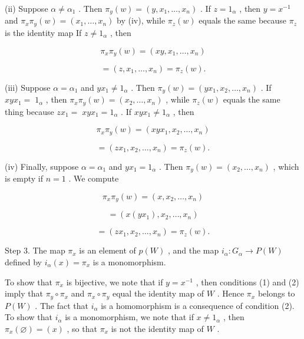 \documentclass[10pt]{article}
\begin{document}
(ii) Suppose \(\alpha  \neq  {\alpha }_{1}\) . Then \({\pi }_{y}\left( w\right)  = \left( {y,{x}_{1},\ldots ,{x}_{n}}\right)\) . If \(z = {1}_{\alpha }\) , then \(y = {x}^{-1}\) and \({\pi }_{x}{\pi }_{y}\left( w\right)  = \left( {{x}_{1},\ldots ,{x}_{n}}\right)\) by (iv), while \({\pi }_{z}\left( w\right)\) equals the same because \({\pi }_{z}\) is the identity map If \(z \neq  {1}_{\alpha }\) , then

\[
{\pi }_{x}{\pi }_{y}\left( w\right)  = \left( {{xy},{x}_{1},\ldots ,{x}_{n}}\right)
\]

\[
= \left( {z,{x}_{1},\ldots ,{x}_{n}}\right)  = {\pi }_{z}\left( w\right) .
\]

(iii) Suppose \(\alpha  = {\alpha }_{1}\) and \(y{x}_{1} \neq  {1}_{\alpha }\) . Then \({\pi }_{y}\left( w\right)  = \left( {y{x}_{1},{x}_{2},\ldots ,{x}_{n}}\right)\) . If \({xy}{x}_{1} = \; {1}_{\alpha }\) , then \({\pi }_{x}{\pi }_{y}\left( w\right)  = \left( {{x}_{2},\ldots ,{x}_{n}}\right)\) , while \({\pi }_{z}\left( w\right)\) equals the same thing because \(z{x}_{1} = \; {xy}{x}_{1} = {1}_{\alpha }\) . If \({xy}{x}_{1} \neq  {1}_{\alpha }\) , then

\[
{\pi }_{x}{\pi }_{y}\left( w\right)  = \left( {{xy}{x}_{1},{x}_{2},\ldots ,{x}_{n}}\right)
\]

\[
= \left( {z{x}_{1},{x}_{2},\ldots ,{x}_{n}}\right)  = {\pi }_{z}\left( w\right) .
\]

(iv) Finally, suppose \(\alpha  = {\alpha }_{1}\) and \(y{x}_{1} = {1}_{\alpha }\) . Then \({\pi }_{y}\left( w\right)  = \left( {{x}_{2},\ldots ,{x}_{n}}\right)\) , which is empty if \(n = 1\) . We compute

\[
{\pi }_{x}{\pi }_{y}\left( w\right)  = \left( {x,{x}_{2},\ldots ,{x}_{n}}\right)
\]

\[
= \left( {x\left( {y{x}_{1}}\right) ,{x}_{2},\ldots ,{x}_{n}}\right)
\]

\[
= \left( {z{x}_{1},{x}_{2},\ldots ,{x}_{n}}\right)  = {\pi }_{z}\left( w\right) .
\]

Step 3. The map \({\pi }_{x}\) is an element of \(p\left( W\right)\) , and the map \({i}_{\alpha } : {G}_{\alpha } \rightarrow  P\left( W\right)\) defined by \({i}_{\alpha }\left( x\right)  = {\pi }_{x}\) is a monomorphism.

To show that \({\pi }_{x}\) is bijective, we note that if \(y = {x}^{-1}\) , then conditions (1) and (2) imply that \({\pi }_{y} \circ  {\pi }_{x}\) and \({\pi }_{x} \circ  {\pi }_{y}\) equal the identity map of \(W\) . Hence \({\pi }_{x}\) belongs to \(P\left( W\right)\) . The fact that \({i}_{\alpha }\) is a homomorphism is a consequence of condition (2). To show that \({i}_{\alpha }\) is a monomorphism, we note that if \(x \neq  {1}_{\alpha }\) , then \({\pi }_{x}\left( \varnothing \right)  = \left( x\right)\) , so that \({\pi }_{x}\) is not the identity map of \(W\) .
\end{document}
